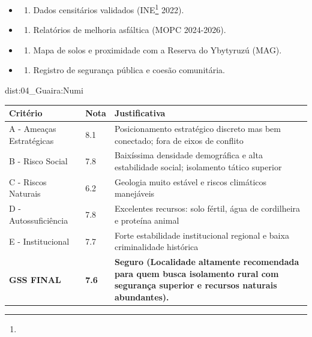 {\begin{itemize}
\tightlist
\item
  \begin{enumerate}
  \def\labelenumi{\arabic{enumi})}
  \tightlist
  \item
    Dados censitários validados (INE\footnote{\fineINE} 2022).
  \end{enumerate}
\item
  \begin{enumerate}
  \def\labelenumi{\arabic{enumi})}
  \setcounter{enumi}{1}
  \tightlist
  \item
    Relatórios de melhoria asfáltica (MOPC 2024-2026).
  \end{enumerate}
\item
  \begin{enumerate}
  \def\labelenumi{\arabic{enumi})}
  \setcounter{enumi}{2}
  \tightlist
  \item
    Mapa de solos e proximidade com a Reserva do Ybytyruzú (MAG).
  \end{enumerate}
\item
  \begin{enumerate}
  \def\labelenumi{\arabic{enumi})}
  \setcounter{enumi}{3}
  \tightlist
  \item
    Registro de segurança pública e coesão comunitária.
  \end{enumerate}
\end{itemize}}{dist:04_Guaira:Numi}
\begin{table}[ht!]
\small \begin{tabular}{p{3.0cm}p{0.8cm}p{6.0cm}} \toprule
\textbf{Critério} & \textbf{Nota} & \textbf{Justificativa} \\ \midrule
A - Ameaças Estratégicas & 8.1 & Posicionamento estratégico discreto mas bem conectado; fora de eixos de conflito \\
B - Risco Social & 7.8 & Baixíssima densidade demográfica e alta estabilidade social; isolamento tático superior \\
C - Riscos Naturais & 6.2 & Geologia muito estável e riscos climáticos manejáveis \\
D - Autossuficiência & 7.8 & Excelentes recursos: solo fértil, água de cordilheira e proteína animal \\
E - Institucional & 7.7 & Forte estabilidade institucional regional e baixa criminalidade histórica \\
\midrule \textbf{GSS FINAL} & \textbf{7.6} & \textbf{Seguro (Localidade altamente recomendada para quem busca isolamento rural com segurança superior e recursos naturais abundantes).} \\ \bottomrule \end{tabular}
\end{table}
